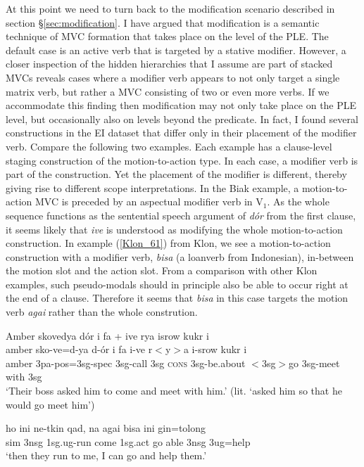 At this point we need to turn back to the modification scenario described in section §\ref{sec:modification}. I have argued that modification is a semantic technique of MVC formation that takes place on the level of the PLE. The default case is an active verb that is targeted by a stative modifier. However, a closer inspection of the hidden hierarchies that I assume are part of stacked MVCs reveals cases where a modifier verb appears to not only target a single matrix verb, but rather a MVC consisting of two or even more verbs. If we accommodate this finding then modification may not only take place on the PLE level, but occasionally also on levels beyond the predicate. In fact, I found several constructions in the EI dataset that differ only in their placement of the modifier verb. Compare the following two examples. Each example has a clause-level staging construction of the motion-to-action type. In each case, a modifier verb is part of the construction. Yet the placement of the modifier is different, thereby giving rise to different scope interpretations. In the Biak example, a motion-to-action MVC is preceded by an aspectual modifier verb in V$_1$. As the whole sequence functions as the sentential speech argument of \textit{dór} from the first clause, it seems likely that \textit{ive} is understood as modifying the whole motion-to-action construction. In example (\ref{Klon_61}) from Klon, we see a motion-to-action construction with a modifier verb, \textit{bisa} (a loanverb from Indonesian), in-between the motion slot and the action slot. From a comparison with other Klon examples, such pseudo-modals should in principle also be able to occur right at the end of a clause. Therefore it seems that \textit{bisa} in this case targets the motion verb \textit{agai} rather than the whole constrution.
 
\ea%
\gll Amber skovedya dór i fa + ive rya isrow kukr i \\
amber sko-ve=d-ya d-ór i fa i-ve r$<$y$>$a i-srow kukr i \\
\glc amber 3\acs{pa}-\acs{pos}=3\acs{sg}-\acs{spec} 3\acs{sg}-call 3\acs{sg} \textsc{cons} 3\acs{sg}-be.about $<$3\acs{sg}$>$go 3\acs{sg}-meet with 3\acs{sg}\\
\glft `Their boss asked him to come and meet with him.' (lit. `asked him so that he
would go meet him') \ 
\z
\xe

\ea \label{Klon_61} 
\gll ho ini ne-tkin qad, na agai bisa ini gin=tolong \\
\acs{sim} 3\acs{nsg} 1\acs{sg}.\acs{ug}-run come 1\acs{sg}.\acs{act} go able 3\acs{nsg} 3\acs{ug}=help \\
\glft `then they run to me, I can go and help them.' \trailingcitation{{\small (Baird 2008: 139)}}\ 
\z
\xe

